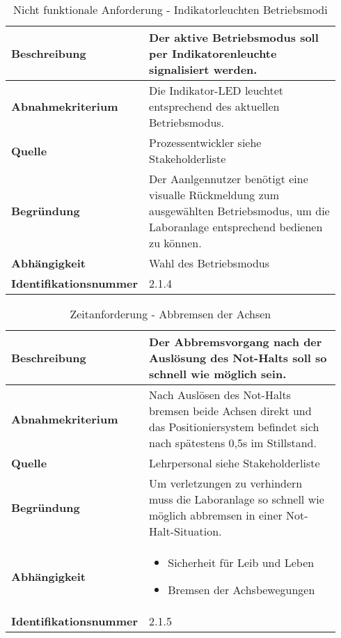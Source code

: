 \documentclass[../../../Bachelorarbeit.tex]{subfiles}
\begin{document}
\begin{table}[H]
    \centering
    \begin{tabular}{| p{0.34\linewidth} | p{0.6\linewidth} |}
        \hline
        \textbf{Beschreibung} & Der aktive Betriebsmodus soll per Indikatorenleuchte signalisiert werden. \\ \hline
        \textbf{Abnahmekriterium} & Die Indikator-LED leuchtet entsprechend des aktuellen Betriebsmodus. \\ \hline
        \textbf{Quelle} & Prozessentwickler siehe Stakeholderliste \\ \hline
        \textbf{Begründung} & Der Aanlgennutzer benötigt eine visualle Rückmeldung zum ausgewählten Betriebsmodus, um die Laboranlage entsprechend bedienen zu können. \\ \hline
        \textbf{Abhängigkeit} & Wahl des Betriebsmodus \\ \hline
        \textbf{Identifikationsnummer} & 2.1.4 \\ \hline
    \end{tabular}
    \caption[\acs{nfa} - Indikatorleuchten Betriebsmodi]{Nicht funktionale Anforderung - Indikatorleuchten Betriebsmodi}
    \label{tab:my-table14}
\end{table}

\begin{table}[H]
    \centering
    \begin{tabular}{| p{0.34\linewidth} | p{0.6\linewidth} |}
        \hline
        \textbf{Beschreibung} & Der Abbremsvorgang nach der Auslösung des Not-Halts soll so schnell wie möglich sein. \\ \hline
        \textbf{Abnahmekriterium} & Nach Auslösen des Not-Halts bremsen beide Achsen direkt und das Positioniersystem befindet sich nach spätestens 0,5s im Stillstand. \\ \hline
        \textbf{Quelle} & Lehrpersonal siehe Stakeholderliste \\ \hline
        \textbf{Begründung} & Um verletzungen zu verhindern muss die Laboranlage so schnell wie möglich abbremsen in einer Not-Halt-Situation. \\ \hline
        \textbf{Abhängigkeit} & {\begin{itemize}[noitemsep,topsep=0pt,parsep=0pt,partopsep=0pt,leftmargin=*]
                                    \item Sicherheit für Leib und Leben
                                    \item Bremsen der Achsbewegungen
                                \end{itemize}} \\ \hline
        \textbf{Identifikationsnummer} & 2.1.5 \\ \hline
    \end{tabular}
    \caption[\acs{nfa} - Abbremsen der Achsen]{Zeitanforderung - Abbremsen der Achsen}
    \label{tab:my-table15}
\end{table}
\end{document}
